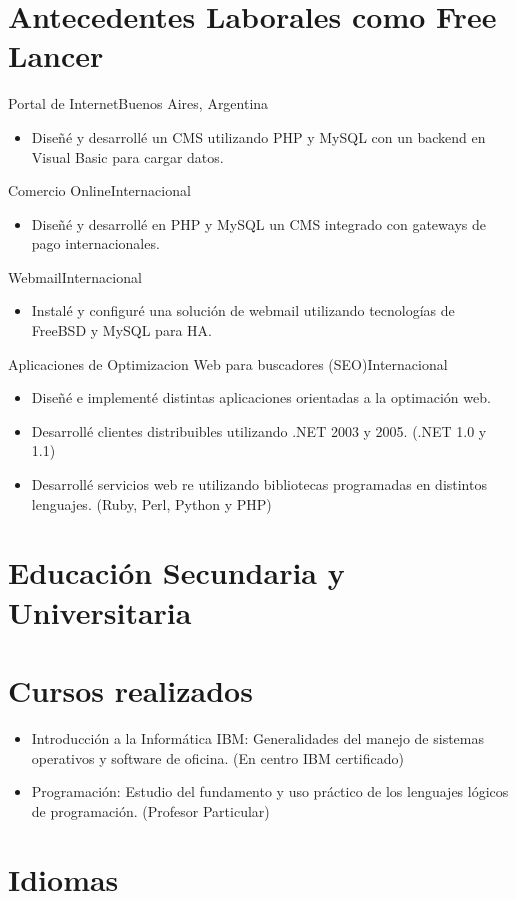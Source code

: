 \documentclass[a4paper,11pt]{moderncv}
\begin{document}
\pagebreak

\section{Antecedentes Laborales como Free Lancer}
{Portal de Internet}{Buenos Aires, Argentina}{}{%
\begin{itemize}
  \item Dise\~n\'e y desarroll\'e un CMS utilizando PHP y MySQL con un backend en Visual Basic para cargar datos.
\end{itemize}
}
%
{Comercio Online}{Internacional}{}{%
\begin{itemize}
  \item Dise\~n\'e y desarroll\'e en PHP y MySQL un CMS integrado con gateways de pago internacionales.
\end{itemize}
}
%
{Webmail}{Internacional}{}{%
\begin{itemize}
  \item Instal\'e y configur\'e una soluci\'on de webmail utilizando tecnolog\'ias de FreeBSD y MySQL para HA.
\end{itemize}
}
%
{Aplicaciones de Optimizacion Web para buscadores (SEO)}{Internacional}{}{%
\begin{itemize}
  \item Dise\~n\'e e implement\'e distintas aplicaciones orientadas a la optimaci\'on web.
  \item Desarroll\'e clientes distribuibles utilizando .NET 2003 y 2005.  (.NET 1.0 y 1.1)
  \item Desarroll\'e servicios web re utilizando bibliotecas programadas en distintos lenguajes. (Ruby, Perl, Python y PHP)
\end{itemize}
}

\section{Educaci\'on Secundaria y Universitaria}

\section{Cursos realizados}
\begin{itemize}
\item Introducci\'on a la Inform\'atica IBM: Generalidades del manejo de sistemas operativos y software de oficina. (En centro IBM certificado)
\item Programaci\'on: Estudio del fundamento y uso pr\'actico de los lenguajes l\'ogicos de programaci\'on. (Profesor Particular)
\end{itemize}

\section{Idiomas}
\end{document}
